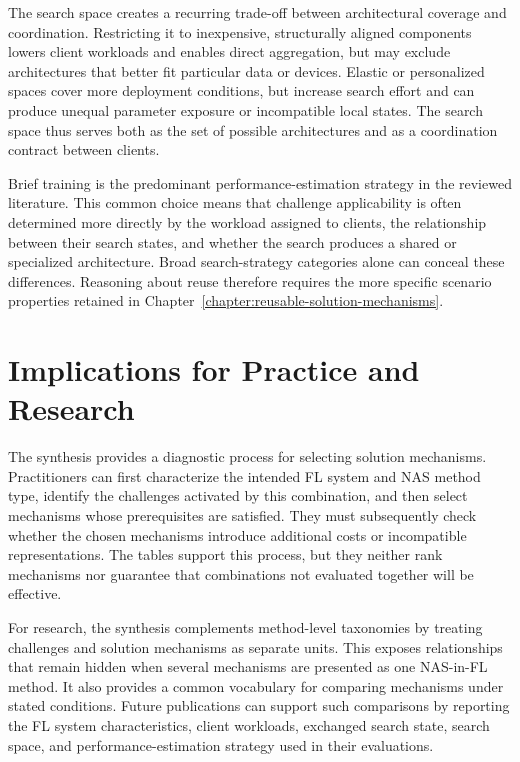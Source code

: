 The search space creates a recurring trade-off between architectural coverage and coordination. Restricting it to inexpensive, structurally aligned components lowers client workloads and enables direct aggregation, but may exclude architectures that better fit particular data or devices. Elastic or personalized spaces cover more deployment conditions, but increase search effort and can produce unequal parameter exposure or incompatible local states. The search space thus serves both as the set of possible architectures and as a coordination contract between clients.

Brief training is the predominant performance-estimation strategy in the reviewed literature. This common choice means that challenge applicability is often determined more directly by the workload assigned to clients, the relationship between their search states, and whether the search produces a shared or specialized architecture. Broad search-strategy categories alone can conceal these differences. Reasoning about reuse therefore requires the more specific scenario properties retained in Chapter~\ref{chapter:reusable-solution-mechanisms}.

\section{Implications for Practice and Research}

The synthesis provides a diagnostic process for selecting solution mechanisms. Practitioners can first characterize the intended FL system and NAS method type, identify the challenges activated by this combination, and then select mechanisms whose prerequisites are satisfied. They must subsequently check whether the chosen mechanisms introduce additional costs or incompatible representations. The tables support this process, but they neither rank mechanisms nor guarantee that combinations not evaluated together will be effective.

For research, the synthesis complements method-level taxonomies by treating challenges and solution mechanisms as separate units. This exposes relationships that remain hidden when several mechanisms are presented as one NAS-in-FL method. It also provides a common vocabulary for comparing mechanisms under stated conditions. Future publications can support such comparisons by reporting the FL system characteristics, client workloads, exchanged search state, search space, and performance-estimation strategy used in their evaluations.

